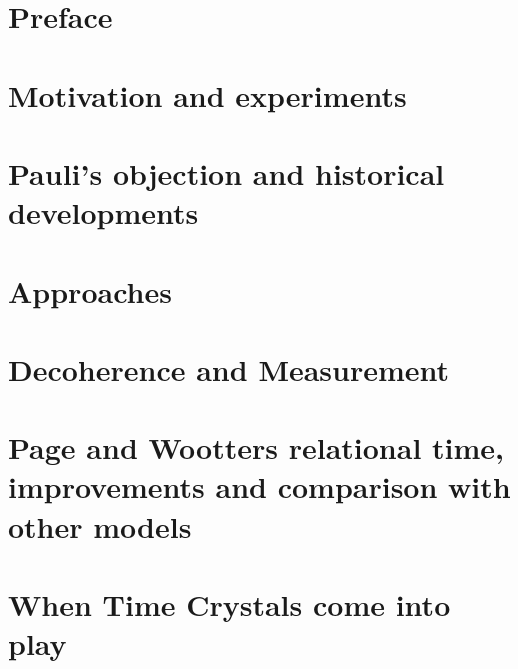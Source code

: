 




\maketitle

\tableofcontents

\chapter*{Preface}


\iftodo
\chapter{Motivation and experiments}

\fi

\chapter{Pauli's objection and historical developments}


\iftodo
\chapter{Approaches}

\fi

\chapter{Decoherence and Measurement}









\chapter{Page and Wootters relational time, improvements and comparison with other models}


\iftodo

\fi

\iftodo
\chapter{When Time Crystals come into play}

\fi

